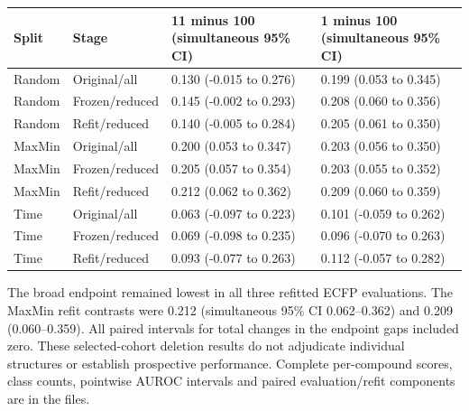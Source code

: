 \begin{center}
\footnotesize
\begin{tabularx}{\linewidth}{llXX}
\toprule
Split & Stage & 11 minus 100 (simultaneous 95\% CI) & 1 minus 100 (simultaneous 95\% CI) \\
\midrule
Random & Original/all & 0.130 (-0.015 to 0.276) & 0.199 (0.053 to 0.345) \\
Random & Frozen/reduced & 0.145 (-0.002 to 0.293) & 0.208 (0.060 to 0.356) \\
Random & Refit/reduced & 0.140 (-0.005 to 0.284) & 0.205 (0.061 to 0.350) \\
MaxMin & Original/all & 0.200 (0.053 to 0.347) & 0.203 (0.056 to 0.350) \\
MaxMin & Frozen/reduced & 0.205 (0.057 to 0.354) & 0.203 (0.055 to 0.352) \\
MaxMin & Refit/reduced & 0.212 (0.062 to 0.362) & 0.209 (0.060 to 0.359) \\
Time & Original/all & 0.063 (-0.097 to 0.223) & 0.101 (-0.059 to 0.262) \\
Time & Frozen/reduced & 0.069 (-0.098 to 0.235) & 0.096 (-0.070 to 0.263) \\
Time & Refit/reduced & 0.093 (-0.077 to 0.263) & 0.112 (-0.057 to 0.282) \\
\bottomrule
\end{tabularx}
\end{center}
The broad endpoint remained lowest in all three refitted ECFP evaluations. The MaxMin refit contrasts were 0.212 (simultaneous 95\% CI 0.062--0.362) and 0.209 (0.060--0.359). All paired intervals for total changes in the endpoint gaps included zero. These selected-cohort deletion results do not adjudicate individual structures or establish prospective performance. Complete per-compound scores, class counts, pointwise AUROC intervals and paired evaluation/refit components are in the  files.
